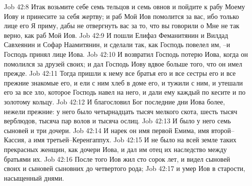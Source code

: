 Job 42:8  Итак возьмите себе семь тельцов и семь овнов и пойдите к рабу Моему Иову и принесите за себя жертву; и раб Мой Иов помолится за вас, ибо только лице его Я приму, дабы не отвергнуть вас за то, что вы говорили о Мне не так верно, как раб Мой Иов.
Job 42:9  И пошли Елифаз Феманитянин и Вилдад Савхеянин и Софар Наамитянин, и сделали так, как Господь повелел им, --и Господь принял лице Иова.
Job 42:10  И возвратил Господь потерю Иова, когда он помолился за друзей своих; и дал Господь Иову вдвое больше того, что он имел прежде.
Job 42:11  Тогда пришли к нему все братья его и все сестры его и все прежние знакомые его, и ели с ним хлеб в доме его, и тужили с ним, и утешали его за все зло, которое Господь навел на него, и дали ему каждый по кесите и по золотому кольцу.
Job 42:12  И благословил Бог последние дни Иова более, нежели прежние: у него было четырнадцать тысяч мелкого скота, шесть тысяч верблюдов, тысяча пар волов и тысяча ослиц.
Job 42:13  И было у него семь сыновей и три дочери.
Job 42:14  И нарек он имя первой Емима, имя второй--Кассия, а имя третьей--Керенгаппух.
Job 42:15  И не было на всей земле таких прекрасных женщин, как дочери Иова, и дал им отец их наследство между братьями их.
Job 42:16  После того Иов жил сто сорок лет, и видел сыновей своих и сыновей сыновних до четвертого рода;
Job 42:17  и умер Иов в старости, насыщенный днями.


